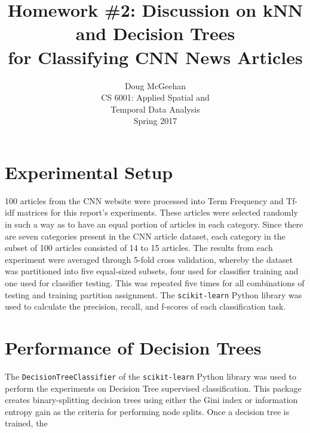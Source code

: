 \documentclass[11pt]{article}
\title{Homework \#2: Discussion on kNN and Decision Trees\\ for Classifying CNN News Articles}
\author{Doug McGeehan\\
		CS 6001: Applied Spatial and \\ Temporal Data Analysis\\
		Spring 2017}
\begin{document}
\maketitle

\section{Experimental Setup}

100 articles from the CNN website were processed into Term Frequency and Tf-idf matrices for this report's experiments.
These articles were selected randomly in such a way as to have an equal portion of articles in each category.
Since there are seven categories present in the CNN article dataset, each category in the subset of 100 articles consisted of 14 to 15 articles.
The results from each experiment were averaged through 5-fold cross validation,
 whereby the dataset was partitioned into five equal-sized subsets, four used for classifier training and one used for classifier testing.
This was repeated five times for all combinations of testing and training partition assignment.
The \texttt{scikit-learn} Python library was used to calculate the precision, recall, and f-scores of each classification task.

\section{Performance of Decision Trees}

The \texttt{DecisionTreeClassifier} of the \texttt{scikit-learn} Python library was used to perform the experiments on Decision Tree supervised classification.
This package creates binary-splitting decision trees using either the Gini index or information entropy gain as the criteria for performing node splits.
Once a decision tree is trained, the 
\end{document}

